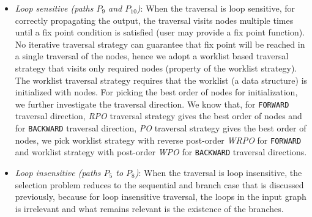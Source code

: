\begin{itemize}
\begin{itemize}
	\item \textit{Loop sensitive (paths $P_9$ and $P_{10}$)}: When the traversal is
	loop sensitive, for correctly propagating the output, the traversal visits
	nodes multiple times until a fix point condition is satisfied (user may
	provide a fix point function). No iterative traversal strategy can guarantee
	that fix point will be reached in a single traversal of the nodes, hence we
	adopt a worklist based traversal strategy that visits only required 
	nodes (property of the worklist strategy). The worklist traversal strategy
	requires that the worklist (a data structure) is initialized with nodes.
	For picking the best order of nodes for initialization, we further investigate
	the traversal direction. We know that, for \lstinline|FORWARD| traversal
	direction, \textit{RPO} traversal strategy gives the best order of nodes and for
	\lstinline|BACKWARD| traversal direction, \textit{PO} traversal strategy gives
	the best order of nodes, we pick worklist strategy with reverse post-order
	\textit{WRPO} for \lstinline|FORWARD| and worklist strategy with post-order
	\textit{WPO} for \lstinline|BACKWARD| traversal directions.
	 \item \textit{Loop insensitive (paths $P_5$ to $P_8$)}: When the traversal is
	 loop insensitive, the selection problem reduces to the sequential and branch case
	 that is discussed previously, because for loop insensitive traversal, the
	 loops in the input graph is irrelevant and what remains relevant
	 is the existence of the branches.
  	\end{itemize}
\end{itemize}

